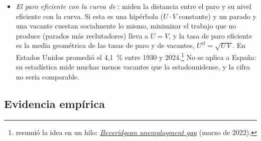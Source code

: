 \documentclass[11pt]{article}
\begin{document}
\begin{itemize}
\item \emph{El paro eficiente con la curva de }: \textcite{MichaillatSaez2021Beveridgean} miden la distancia entre el paro y su nivel eficiente con la curva. Si esta es una hipérbola ($U\cdot V$ constante) y un parado y una vacante cuestan socialmente lo mismo, minimizar el trabajo que no produce (parados más reclutadores) lleva a $U=V$, y la tasa de paro eficiente es la media geométrica de las tasas de paro y de vacantes, $U^{\mathrm{ef}}=\sqrt{U\,V}$. En Estados Unidos promedió el 4,1~\% entre 1930 y 2024\nocite{MichaillatSaez2024FERU}.\footnote{ resumió la idea en un hilo: \href{https://twitter.com/pmichaillat/status/1507844157145944067}{\emph{Beveridgean unemployment gap}} (marzo de 2022).} No se aplica a España: su estadística mide muchas menos vacantes que la estadounidense, y la cifra no sería comparable.
\end{itemize}

\subsection{Evidencia empírica}\label{sec:dmp-evidencia}
\end{document}
